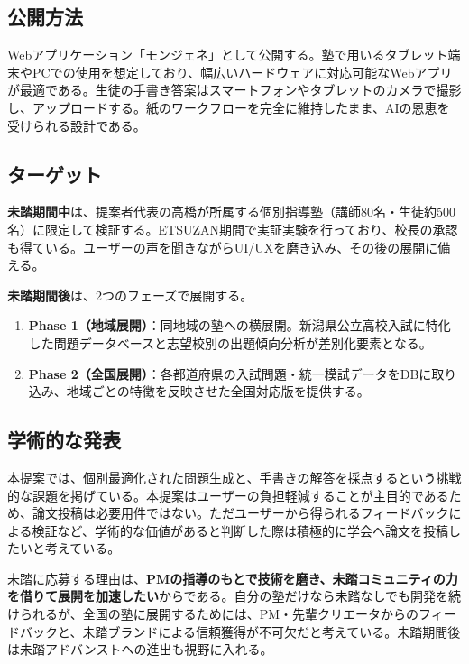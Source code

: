 \documentclass[paper=a4,fontsize=10.5bp,jafontsize=10.5bp,twocolumn]{jlreq}
\begin{document}
\subsection{公開方法}

Webアプリケーション「モンジェネ」として公開する。塾で用いるタブレット端末やPCでの使用を想定しており、幅広いハードウェアに対応可能なWebアプリが最適である。生徒の手書き答案はスマートフォンやタブレットのカメラで撮影し、アップロードする。紙のワークフローを完全に維持したまま、AIの恩恵を受けられる設計である。

\subsection{ターゲット}

\textbf{未踏期間中}は、提案者代表の高橋が所属する個別指導塾（講師80名・生徒約500名）に限定して検証する。ETSUZAN期間で実証実験を行っており、校長の承認も得ている。ユーザーの声を聞きながらUI/UXを磨き込み、その後の展開に備える。

\textbf{未踏期間後}は、2つのフェーズで展開する。

\begin{enumerate}[leftmargin=2em]
  \item \textbf{Phase 1（地域展開）}：同地域の塾への横展開。新潟県公立高校入試に特化した問題データベースと志望校別の出題傾向分析が差別化要素となる。
  \item \textbf{Phase 2（全国展開）}：各都道府県の入試問題・統一模試データをDBに取り込み、地域ごとの特徴を反映させた全国対応版を提供する。
\end{enumerate}

\subsection{学術的な発表}

本提案では、個別最適化された問題生成と、手書きの解答を採点するという挑戦的な課題を掲げている。本提案はユーザーの負担軽減することが主目的であるため、論文投稿は必要用件ではない。ただユーザーから得られるフィードバックによる検証など、学術的な価値があると判断した際は積極的に学会へ論文を投稿したいと考えている。

未踏に応募する理由は、\textbf{PMの指導のもとで技術を磨き、未踏コミュニティの力を借りて展開を加速したい}からである。自分の塾だけなら未踏なしでも開発を続けられるが、全国の塾に展開するためには、PM・先輩クリエータからのフィードバックと、未踏ブランドによる信頼獲得が不可欠だと考えている。未踏期間後は未踏アドバンストへの進出も視野に入れる。
\end{document}
